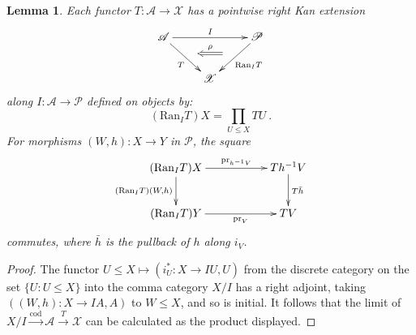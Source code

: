 \documentclass[a4paper,12pt,reqno]{amsart}
\newtheorem{lemma}[theorem]{Lemma}
\theoremstyle{definition}
\theoremstyle{fact}
\theoremstyle{genquest}
\theoremstyle{step}
\newcommand{\lra}{\longrightarrow}
\def\CA{{\mathscr A}}
\def\CP{{\mathscr P}}
\def\CX{{\mathscr X}}
\begin{document}
\begin{lemma}
Each functor $T:\CA \lra \CX$ has a pointwise right Kan extension
\begin{equation}
\begin{aligned}
\xymatrix{
\CA \ar[rd]_{T}^(0.5){\phantom{a}}="1" \ar[rr]^{I}  && \CP \ar[ld]^{\mathrm{Ran}_IT}_(0.5){\phantom{a}}="2" \ar@{<=}"1";"2"^-{\rho}
\\
& \CX 
}
\end{aligned}
\end{equation}  
along $I:\CA \lra \CP$ defined on objects by:
$$(\mathrm{Ran}_IT)X = \prod_{U\le X}TU \ .$$
For morphisms $(W,h) :X\lra Y$ in $\CP$, the square
\begin{equation}
\begin{aligned}
\xymatrix{
(\mathrm{Ran}_IT)X \ar[rr]^-{\mathrm{pr}_{h^{-1}V}} \ar[d]_-{(\mathrm{Ran}_IT)(W,h)} && Th^{-1}V \ar[d]^-{T\bar{h}} \\
(\mathrm{Ran}_IT)Y \ar[rr]_-{\mathrm{pr}_V} && TV 
}
\end{aligned}
\end{equation}
commutes, where $\bar{h}$ is the pullback of $h$ along $i_V$.
\end{lemma}
\begin{proof}
The functor $U\le X \mapsto (i_U^* : X\lra IU, U)$ from the discrete category 
on the set $\{U : U\le X\}$ into the comma category
$X/I$ has a right adjoint, taking $((W,h): X\lra IA,A)$ to $W\le X$, and so is initial. 
It follows that the limit of 
$X/I \stackrel{\mathrm{cod}}\lra \CA \stackrel{T}\lra \CX$
can be calculated as the product displayed.
\end{proof}
\end{document}
